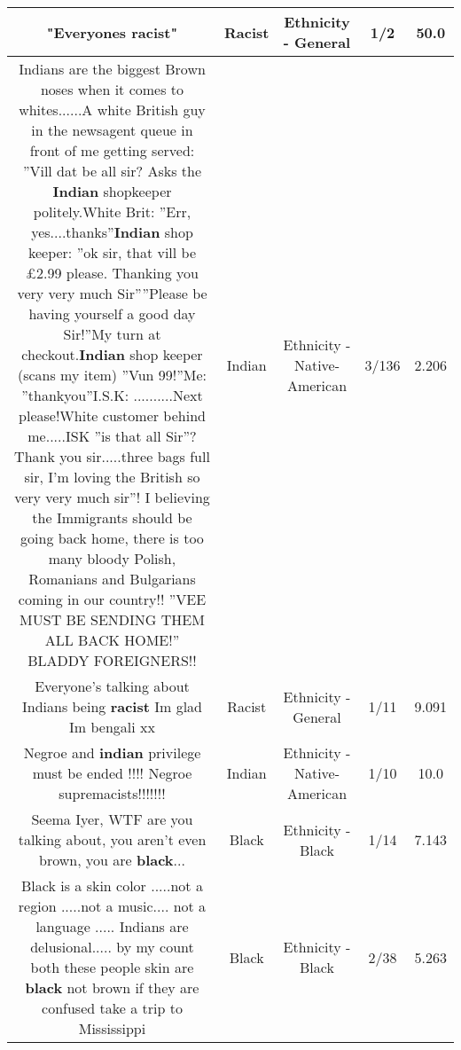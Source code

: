 \documentclass[11pt]{article}
\newlength\mylength
\begin{document}
\begin{center}
\begin{longtable}{|C{.65\mylength}|C{.30\mylength}|C{.12\mylength}|C{.12\mylength}|C{.12\mylength}|}
  \small "Everyones \textbf{racist}"\normalsize   & Racist & Ethnicity - General & 1/2 & 50.0 \\  \hline
  \small Indians are the biggest Brown noses when it comes to whites......A white British guy in the newsagent queue in front of me getting served: ''Vill dat be all sir? Asks the \textbf{Indian} shopkeeper politely.White Brit: ''Err, yes....thanks''\textbf{Indian} shop keeper: ''ok sir, that vill be £2.99 please. Thanking you very very much Sir''''Please be having yourself a good day Sir!''My turn at checkout.\textbf{Indian} shop keeper (scans my item) ''Vun 99!''Me: ''thankyou''I.S.K: ..........Next please!White customer behind me.....ISK ''is that all Sir''? Thank you sir.....three bags full sir, I'm loving the British so very very much sir''! I believing the Immigrants should be going back home, there is too many bloody Polish, Romanians and Bulgarians coming in our country!! ''VEE MUST BE SENDING THEM ALL BACK HOME!'' BLADDY FOREIGNERS!!\normalsize   & Indian & Ethnicity - Native-American & 3/136 & 2.206 \\  \hline
  \small Everyone's talking about Indians being \textbf{racist} Im glad Im bengali xx\normalsize   & Racist & Ethnicity - General & 1/11 & 9.091 \\  \hline
  \small Negroe and \textbf{indian} privilege must be ended !!!!   Negroe supremacists!!!!!!!\normalsize   & Indian & Ethnicity - Native-American & 1/10 & 10.0 \\  \hline
  \small Seema Iyer, WTF are you talking about, you aren't even brown, you are \textbf{black}...\normalsize   & Black & Ethnicity - Black & 1/14 & 7.143 \\  \hline
  \small Black is a skin color .....not a region .....not a music.... not a language ..... Indians are delusional..... by my count both these people skin are \textbf{black} not brown if they are confused take a trip to Mississippi\normalsize   & Black & Ethnicity - Black & 2/38 & 5.263 \\  \hline

\end{longtable}
\end{center}
\end{document}
